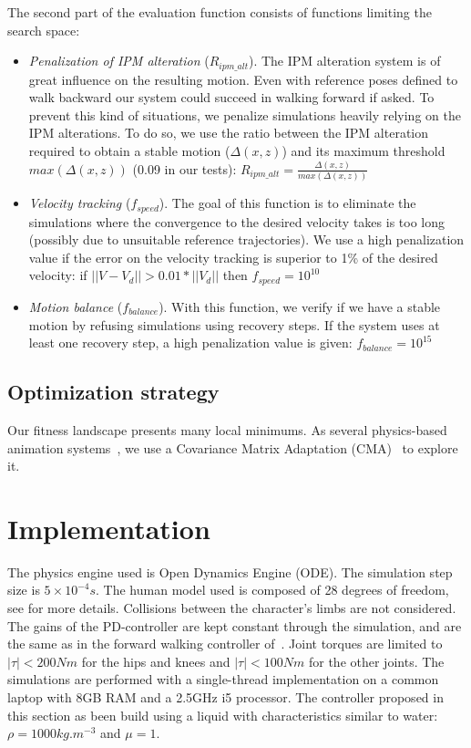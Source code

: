 \documentclass[conference]{acmsiggraph}
\begin{document}
The second part of the evaluation function consists of functions limiting the search space:
\begin{itemize}
\item{\textit{Penalization of IPM alteration} ($R_{ipm\_alt}$). The IPM alteration system is of great influence on the resulting motion. Even with reference poses defined to walk backward our system could succeed in walking forward if asked. To prevent this kind of situations, we penalize simulations heavily relying on the IPM alterations. To do so, we use the ratio between the IPM alteration required to obtain a stable motion ($\Delta(x,z)$) and its maximum threshold $max(\Delta(x,z))$ (0.09 in our tests): $R_{ipm\_alt}=\frac{\Delta(x,z)}{max(\Delta(x,z))}$}
\item{\textit{Velocity tracking} ($f_{speed}$). The goal of this function is to eliminate the simulations where the convergence to the desired velocity takes is too long (possibly due to unsuitable reference trajectories). We use a high penalization value if the error on the velocity tracking is superior to 1\% of the desired velocity: if $||V-V_d||>0.01*||V_d||$ then $f_{speed}=10^{10}$}
\item{\textit{Motion balance} ($f_{balance}$). With this function, we verify if we have a stable motion by refusing simulations using recovery steps. If the system uses at least one recovery step, a high penalization value is given: $f_{balance}=10^{15}$}
\end{itemize}

\subsection{Optimization strategy}
Our fitness landscape presents many local minimums. As several physics-based animation systems~\cite{geijtenbeek2012simple,tan2011articulated}, we use a Covariance Matrix Adaptation (CMA)~\cite{hansen2006cma} to explore it.


\section{Implementation}
\label{sec:implementation}
The physics engine used is Open Dynamics Engine (ODE). The simulation step size is $5 \times 10^{-4}s$. The human model used is composed of 28 degrees of freedom, see \cite{coros2009robust} for more details. Collisions between the character's limbs are not considered. The gains of the PD-controller are kept constant through the simulation, and are the same as in the forward walking controller of~\cite{coros2009robust}. Joint torques are limited to $|\tau|<200Nm$  for the hips and knees and $|\tau|<100Nm$  for the other joints. The simulations are performed with a single-thread implementation on a common laptop with 8GB RAM and a 2.5GHz i5 processor. The controller proposed in this section as been build using a liquid with characteristics similar to water: $\rho=1000kg.m^{-3}$ and $\mu=1$.
\end{document}
